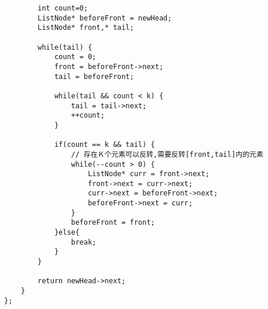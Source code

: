\begin{description}
\begin{lstlisting}
		int count=0;
		ListNode* beforeFront = newHead;
		ListNode* front,* tail;

		while(tail) {
			count = 0;
			front = beforeFront->next;
			tail = beforeFront;

			while(tail && count < k) {
				tail = tail->next;
				++count;
			}

			if(count == k && tail) { 
				// 存在Ｋ个元素可以反转,需要反转[front,tail]内的元素
				while(--count > 0) {
					ListNode* curr = front->next;
					front->next = curr->next;
					curr->next = beforeFront->next;
					beforeFront->next = curr;
				}
				beforeFront = front;
			}else{
				break;
			}
		}

		return newHead->next;
    }
};

		\end{lstlisting}
\end{description}

